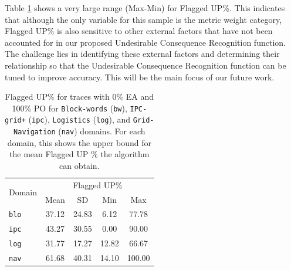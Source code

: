 Table \ref{tab:flagupupperbound} shows a very large range (Max-Min) for Flagged UP\%. 
This indicates that although the only variable for this sample is the metric weight category, Flagged UP\% is also sensitive to other external factors that have not been accounted for in our proposed Undesirable Consequence Recognition function. 
The challenge lies in identifying these external factors and determining their relationship so that the Undesirable Consequence Recognition function can be tuned to improve accuracy. 
This will be the main focus of our future work. 

\begin{table}[tpb]
	\centering
\caption{Flagged UP\% for traces with 0\% EA and 100\% PO for \texttt{Block-words} (\texttt{bw}), \texttt{IPC-grid+} (\texttt{ipc}), \texttt{Logistics} (\texttt{log}), and \texttt{Grid-Navigation}   (\texttt{nav}) domains. For each domain, this shows the upper bound for the mean Flagged UP \% the algorithm can obtain.}
		\label{tab:flagupupperbound}
    \begin{small}
	\begin{tabular}{|l|c|c|c|c|}
		\hline
		\multirow{2}{*}{Domain} & \multicolumn{4}{c|}{Flagged UP\%} \\ \cline{2-5} 
		& Mean   & SD     & Min    & Max    \\ \hline
		\texttt{blo}  & 37.12  & 24.83  & 6.12   & 77.78  \\ 
		\texttt{ipc}  & 43.27  & 30.55  & 0.00   & 90.00  \\ 
		\texttt{log}  & 31.77  & 17.27  & 12.82  & 66.67  \\ 
		\texttt{nav}  & 61.68  & 40.31  & 14.10  & 100.00 \\ \hline
	\end{tabular}
\end{small}
\end{table}  

